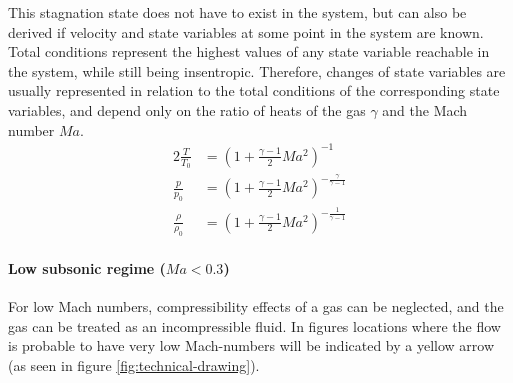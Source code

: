 	This stagnation state does not have to exist in the system, but can also be derived if velocity and state variables at some point in the system are known.
	Total conditions represent the highest values of any state variable reachable in the system, while still being insentropic.
	Therefore, changes of state variables are usually represented in relation to the total conditions of the corresponding state variables, and depend only on the ratio of heats of the gas $\gamma$ and the Mach number $Ma$.
	\begin{alignat}{2}
	    \frac{T}{T_0}   & = \left( 1 + \frac{\gamma - 1}{2} Ma^2 \right)^{-1} \label{eq:total_relation_T}\\
	    \frac{p}{p_0}   & = \left( 1 + \frac{\gamma - 1}{2} Ma^2 \right)^{-\frac{\gamma}{\gamma - 1}} \label{eq:total_relation_p}\\
	    \frac{\rho}{\rho_0} & = \left( 1 + \frac{\gamma - 1}{2} Ma^2 \right)^{-\frac{1}{\gamma - 1}} \label{eq:total_relation_rho}
	\end{alignat}

	\paragraph{Low subsonic regime ($Ma < 0.3$)}
		For low Mach numbers, compressibility effects of a gas can be neglected, and the gas can be treated as an incompressible fluid.
		In figures locations where the flow is probable to have very low Mach-numbers will be indicated by a yellow arrow (as seen in figure \ref{fig:technical-drawing}).

